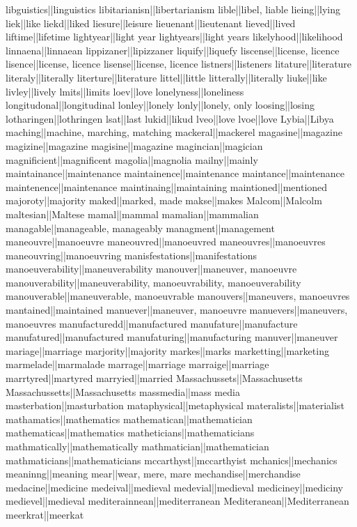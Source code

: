 libguistics||linguistics
libitarianisn||libertarianism
lible||libel, liable
lieing||lying
liek||like
liekd||liked
liesure||leisure
lieuenant||lieutenant
lieved||lived
liftime||lifetime
lightyear||light year
lightyears||light years
likelyhood||likelihood
linnaena||linnaean
lippizaner||lipizzaner
liquify||liquefy
liscense||license, licence
lisence||license, licence
lisense||license, licence
listners||listeners
litature||literature
literaly||literally
literture||literature
littel||little
litterally||literally
liuke||like
livley||lively
lmits||limits
loev||love
lonelyness||loneliness
longitudonal||longitudinal
lonley||lonely
lonly||lonely, only
loosing||losing
lotharingen||lothringen
lsat||last
lukid||likud
lveo||love
lvoe||love
Lybia||Libya
maching||machine, marching, matching
mackeral||mackerel
magasine||magazine
magizine||magazine
magisine||magazine
magincian||magician
magnificient||magnificent
magolia||magnolia
mailny||mainly
maintainance||maintenance
maintainence||maintenance
maintance||maintenance
maintenence||maintenance
maintinaing||maintaining
maintioned||mentioned
majoroty||majority
maked||marked, made
makse||makes
Malcom||Malcolm
maltesian||Maltese
mamal||mammal
mamalian||mammalian
managable||manageable, manageably
managment||management
maneouvre||manoeuvre
maneouvred||manoeuvred
maneouvres||manoeuvres
maneouvring||manoeuvring
manisfestations||manifestations
manoeuverability||maneuverability
manouver||maneuver, manoeuvre
manouverability||maneuverability, manoeuvrability, manoeuverability
manouverable||maneuverable, manoeuvrable
manouvers||maneuvers, manoeuvres
mantained||maintained
manuever||maneuver, manoeuvre
manuevers||maneuvers, manoeuvres
manufacturedd||manufactured
manufature||manufacture
manufatured||manufactured
manufaturing||manufacturing
manuver||maneuver
mariage||marriage
marjority||majority
markes||marks
marketting||marketing
marmelade||marmalade
marrage||marriage
marraige||marriage
marrtyred||martyred
marryied||married
Massachussets||Massachusetts
Massachussetts||Massachusetts
massmedia||mass media
masterbation||masturbation
mataphysical||metaphysical
materalists||materialist
mathamatics||mathematics
mathematican||mathematician
mathematicas||mathematics
matheticians||mathematicians
mathmatically||mathematically
mathmatician||mathematician
mathmaticians||mathematicians
mccarthyst||mccarthyist
mchanics||mechanics
meaninng||meaning
mear||wear, mere, mare
mechandise||merchandise
medacine||medicine
medeival||medieval
medevial||medieval
mediciney||mediciny
medievel||medieval
mediterainnean||mediterranean
Mediteranean||Mediterranean
meerkrat||meerkat
